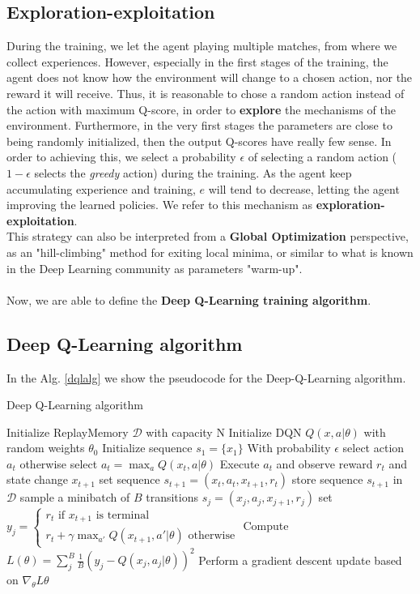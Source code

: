 \documentclass{article}
\begin{document}
\subsection{Exploration-exploitation}
During the training, we let the agent playing multiple matches, from where we collect experiences. However, especially in the first stages of the training, the agent does not know how the environment will change to a chosen action, nor the reward it will receive. Thus, it is reasonable to chose a random action instead of the action with maximum Q-score, in order to \textbf{explore} the mechanisms of the environment. Furthermore, in the very first stages the parameters are close to being randomly initialized, then the output Q-scores have really few sense. In order to achieving this, we select a probability $\epsilon$ of selecting a random action ($1 - \epsilon$ selects the \textit{greedy} action) during the training. As the agent keep accumulating experience and training, $e$ will tend to decrease, letting the agent improving the learned policies. We refer to this mechanism as \textbf{exploration-exploitation}.\\
This strategy can also be interpreted from a \textbf{Global Optimization} perspective, as an "hill-climbing" method for exiting local minima, or similar to what is known in the Deep Learning community as parameters "warm-up".
\\
\\
Now, we are able to define the \textbf{Deep Q-Learning training algorithm}.
\subsection{Deep Q-Learning algorithm \cite{dqn}}

In the Alg. \ref{dqlalg} we show the pseudocode for the Deep-Q-Learning algorithm.
\begin{algorithm}[H]
	\caption{Deep Q-Learning algorithm}
	\label{dqlalg}
	\begin{algorithmic}
		\State Initialize ReplayMemory $\mathcal{D}$ with capacity N
		\State Initialize DQN $Q(x, a|\theta)$ with random weights $\theta_0$
		\State Initialize sequence $s_1=\{x_1\}$
			\State With probability $\epsilon$ select action $a_t$ 
			\State otherwise select $a_t=\max_{a}Q(x_t, a|\theta)$
			\State Execute $a_t$ and observe reward $r_t$ and state change $x_{t+1}$
			\State set sequence $s_{t+1}=(x_t, a_t, x_{t+1}, r_t)$ 
			\State store sequence $s_{t+1}$ in $\mathcal{D}$
			\State sample a minibatch of $B$ transitions $s_j=(x_j, a_j, x_{j+1}, r_j)$
			\State set $y_j = 
			\begin{cases}
				r_t \text{ if $x_{t+1}$ is terminal} \\
				r_t + \gamma\max_{a'}Q(x_{t+1}, a'|\theta) \text{ otherwise}
			\end{cases}
			$
			\State Compute $L(\theta) = \sum_{j}^{B} \frac{1}{B} (y_j - Q(x_j, a_j|\theta) )^2 $
			\State Perform a gradient descent update based on $\nabla_\theta L\theta$
		\EndFor		
		\EndFor
	\end{algorithmic}
\end{algorithm}
\end{document}
